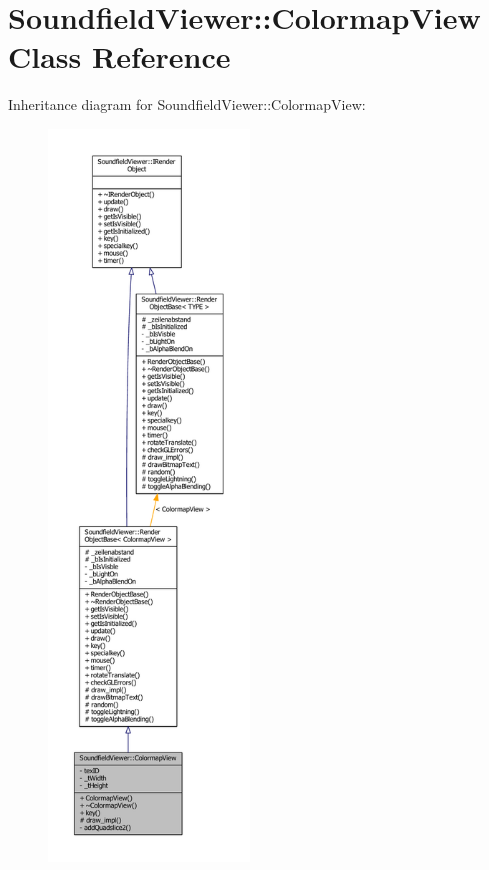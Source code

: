 \section{Soundfield\-Viewer\-:\-:Colormap\-View Class Reference}
\label{classSoundfieldViewer_1_1ColormapView}


Inheritance diagram for Soundfield\-Viewer\-:\-:Colormap\-View\-:\nopagebreak
\begin{figure}[H]
\begin{center}
\leavevmode
\includegraphics[height=550pt]{d1/d52/classSoundfieldViewer_1_1ColormapView__inherit__graph}
\end{center}
\end{figure}


